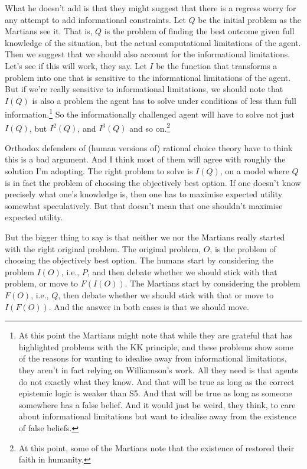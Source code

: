 \documentclass[11pt,]{book}
\let\rmarkdownfootnote\footnote%
\def\footnote{\protect\rmarkdownfootnote}
\begin{document}
What he doesn't add is that they might suggest that there is a regress worry for any attempt to add informational constraints. Let \(Q\) be the initial problem as the Martians see it. That is, \(Q\) is the problem of finding the best outcome given full knowledge of the situation, but the actual computational limitations of the agent. Then we suggest that we should also account for the informational limitations. Let's see if this will work, they say. Let \(I\) be the function that transforms a problem into one that is sensitive to the informational limitations of the agent. But if we're really sensitive to informational limitations, we should note that \(I(Q)\) is also a problem the agent has to solve under conditions of less than full information.\footnote{At this point the Martians might note that while they are grateful that \citet{Williamson2000} has highlighted problems with the KK principle, and these problems show some of the reasons for wanting to idealise away from informational limitations, they aren't in fact relying on Williamson's work. All they need is that agents do not exactly what they know. And that will be true as long as the correct epistemic logic is weaker than S5. And that will be true as long as someone somewhere has a false belief. And it would just be weird, they think, to care about informational limitations but want to idealise away from the existence of false beliefs.} So the informationally challenged agent will have to solve not just \(I(Q)\), but \(I^2(Q)\), and \(I^3(Q)\) and so on.\footnote{At this point, some of the Martians note that the existence of \citet{Elster1979} restored their faith in humanity.}

Orthodox defenders of (human versions of) rational choice theory have to think this is a bad argument. And I think most of them will agree with roughly the solution I'm adopting. The right problem to solve is \(I(Q)\), on a model where \(Q\) is in fact the problem of choosing the objectively best option. If one doesn't know precisely what one's knowledge is, then one has to maximise expected utility somewhat speculatively. But that doesn't mean that one shouldn't maximise expected utility.

But the bigger thing to say is that neither we nor the Martians really started with the right original problem. The original problem, \(O\), is the problem of choosing the objectively best option. The humans start by considering the problem \(I(O)\), i.e., \(P\), and then debate whether we should stick with that problem, or move to \(F(I(O))\). The Martians start by considering the problem \(F(O)\), i.e., \(Q\), then debate whether we should stick with that or move to \(I(F(O))\). And the answer in both cases is that we should move.
\end{document}
